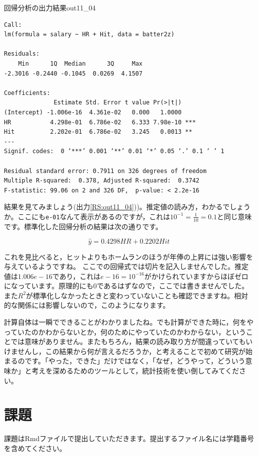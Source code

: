 \documentclass{ltjbook}
\begin{document}
\begin{Rscreen}{回帰分析の出力結果}{out11_04}
	\begin{verbatim}
Call:
lm(formula = salary ~ HR + Hit, data = batter2z)

Residuals:
    Min      1Q  Median      3Q     Max 
-2.3016 -0.2440 -0.1045  0.0269  4.1507 

Coefficients:
              Estimate Std. Error t value Pr(>|t|)    
(Intercept) -1.006e-16  4.361e-02   0.000   1.0000    
HR           4.298e-01  6.786e-02   6.333 7.98e-10 ***
Hit          2.202e-01  6.786e-02   3.245   0.0013 ** 
---
Signif. codes:  0 ‘***’ 0.001 ‘**’ 0.01 ‘*’ 0.05 ‘.’ 0.1 ‘ ’ 1

Residual standard error: 0.7911 on 326 degrees of freedom
Multiple R-squared:  0.378,	Adjusted R-squared:  0.3742 
F-statistic: 99.06 on 2 and 326 DF,  p-value: < 2.2e-16
\end{verbatim}
\end{Rscreen}

結果を見てみましょう(出力\ref{RS:out11_04}))。推定値の読み方，わかるでしょうか。ここにも\verb|e-01|なんて表示があるのですが，これは$10^{-1}=\frac{1}{10}=0.1$と同じ意味です。標準化した回帰分析の結果は次の通りです。

\[ \hat{y} = 0.4298 HR + 0.2202 Hit \]

これを見比べると，ヒットよりもホームランのほうが年俸の上昇には強い影響を与えているようですね。
ここでの回帰式では切片を記入しませんでした。推定値は$1.006e-16$であり，これは$e-16=10^{-16}$がかけられていますからほぼゼロになっています。原理的にも$0$であるはずなので，ここでは書きませんでした。
また$R^2$が標準化しなかったときと変わっていないことも確認できますね。相対的な関係には影響しないので，このようになります。

計算自体は一瞬でできることがわかりましたね。でも計算ができた時に，何をやっていたのかわからないとか，何のためにやっていたのかわからない，ということでは意味がありません。またもちろん，結果の読み取り方が間違っていてもいけませんし，この結果から何が言えるだろうか，と考えることで初めて研究が始まるのです。「やった，できた」だけではなく，「なぜ，どうやって，どういう意味か」と考えを深めるためのツールとして，統計技術を使い倒してみてください。

\section{課題}
課題はRmdファイルで提出していただきます。提出するファイル名には学籍番号を含めてください。
\end{document}
